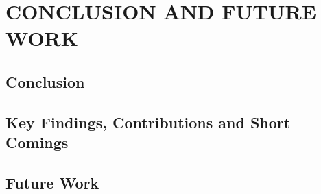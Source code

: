 \chapter{CONCLUSION AND FUTURE WORK} \label{chap6}
	\section{Conclusion}
	\section{Key Findings, Contributions and Short Comings}
	\section{Future Work}
